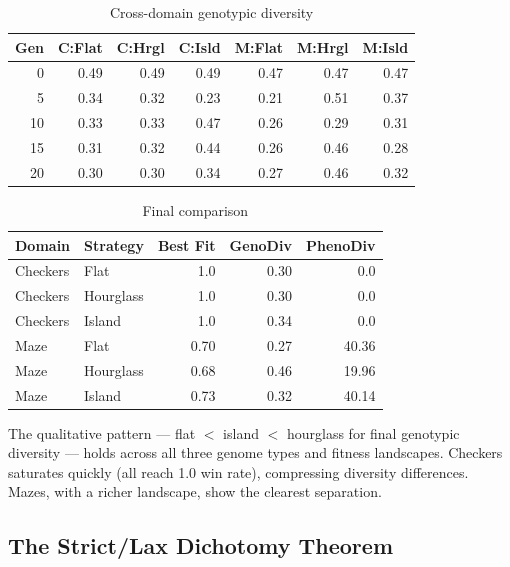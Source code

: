 \documentclass[10pt]{article}
\begin{document}
\begin{table}[ht]
\centering
\caption{Cross-domain genotypic diversity}
\label{tab:cross-domain}
\begin{tabular}{@{}rrrrrrr@{}}
\toprule
\textbf{Gen} & \textbf{C:Flat} & \textbf{C:Hrgl} & \textbf{C:Isld} & \textbf{M:Flat} & \textbf{M:Hrgl} & \textbf{M:Isld} \\
\midrule
0  & 0.49 & 0.49 & 0.49 & 0.47 & 0.47 & 0.47 \\
5  & 0.34 & 0.32 & 0.23 & 0.21 & 0.51 & 0.37 \\
10 & 0.33 & 0.33 & 0.47 & 0.26 & 0.29 & 0.31 \\
15 & 0.31 & 0.32 & 0.44 & 0.26 & 0.46 & 0.28 \\
20 & 0.30 & 0.30 & 0.34 & 0.27 & 0.46 & 0.32 \\
\bottomrule
\end{tabular}
\end{table}

\begin{table}[ht]
\centering
\caption{Final comparison}
\label{tab:final-comparison}
\begin{tabular}{@{}llrrr@{}}
\toprule
\textbf{Domain} & \textbf{Strategy} & \textbf{Best Fit} & \textbf{GenoDiv} & \textbf{PhenoDiv} \\
\midrule
Checkers & Flat      & 1.0  & 0.30 & 0.0 \\
Checkers & Hourglass & 1.0  & 0.30 & 0.0 \\
Checkers & Island    & 1.0  & 0.34 & 0.0 \\
Maze     & Flat      & 0.70 & 0.27 & 40.36 \\
Maze     & Hourglass & 0.68 & 0.46 & 19.96 \\
Maze     & Island    & 0.73 & 0.32 & 40.14 \\
\bottomrule
\end{tabular}
\end{table}

The qualitative pattern --- flat $<$ island $<$ hourglass for final genotypic diversity --- holds across all three genome types and fitness landscapes. Checkers saturates quickly (all reach 1.0 win rate), compressing diversity differences. Mazes, with a richer landscape, show the clearest separation.


\subsection{The Strict/Lax Dichotomy Theorem}
\label{sec:dichotomy}
\end{document}
